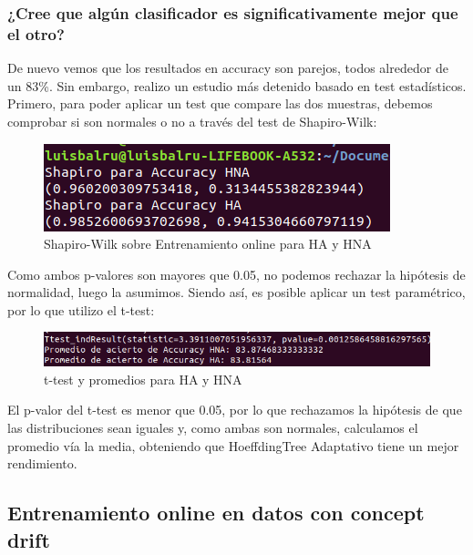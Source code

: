 \subsubsection{¿Cree que algún clasificador es significativamente mejor que el otro?}

De nuevo vemos que los resultados en accuracy son parejos, todos alrededor de un 83\%. Sin embargo, realizo un estudio más detenido basado en test estadísticos. Primero, para poder aplicar un test que compare las dos muestras, debemos comprobar si son normales o no a través del test de Shapiro-Wilk:

\begin{figure}[H] %
	\centering
	\includegraphics[scale=0.4]{onl3.png}  %
	\caption{Shapiro-Wilk sobre Entrenamiento online para HA y HNA} 
	\label{fig:onl3}
\end{figure}

Como ambos p-valores son mayores que 0.05, no podemos rechazar la hipótesis de normalidad, luego la asumimos. Siendo así, es posible aplicar un test paramétrico, por lo que utilizo el t-test:

\begin{figure}[H] %
	\centering
	\includegraphics[scale=0.4]{onl4.png}  %
	\caption{t-test y promedios para HA y HNA} 
	\label{fig:onl4}
\end{figure}

El p-valor del t-test es menor que 0.05, por lo que rechazamos la hipótesis de que las distribuciones sean iguales y, como ambas son normales, calculamos el promedio vía la media, obteniendo que HoeffdingTree Adaptativo tiene un mejor rendimiento.

\subsection{Entrenamiento online en datos con concept drift}

